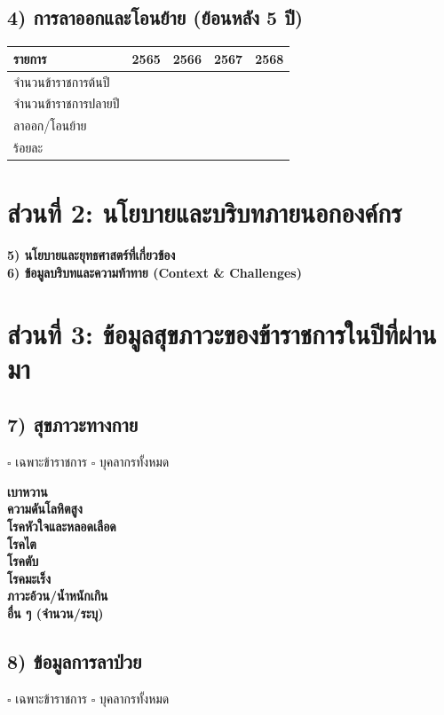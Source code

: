 \documentclass[12pt,a4paper]{article}
\newcommand{\linefield}[1]{\textbf{#1} \hrulefill}
\newcommand{\boxitem}[1]{\(\square\) #1}
\begin{document}
\subsection*{4) การลาออกและโอนย้าย (ย้อนหลัง 5 ปี)}
\begin{longtable}{|p{}|p{}|p{}|p{}|p{}|}
\hline
\textbf{รายการ} & \textbf{2565} & \textbf{2566} & \textbf{2567} & \textbf{2568} \\\hline
จำนวนข้าราชการต้นปี & & & & \\\hline
จำนวนข้าราชการปลายปี & & & & \\\hline
ลาออก/โอนย้าย & & & & \\\hline
ร้อยละ & & & & \\\hline
\end{longtable}

\section*{ส่วนที่ 2: นโยบายและบริบทภายนอกองค์กร}
\linefield{5) นโยบายและยุทธศาสตร์ที่เกี่ยวข้อง}\\[2.2em]
\linefield{6) ข้อมูลบริบทและความท้าทาย (Context \& Challenges)}\\[2.2em]

\section*{ส่วนที่ 3: ข้อมูลสุขภาวะของข้าราชการในปีที่ผ่านมา}
\subsection*{7) สุขภาวะทางกาย}
\boxitem{เฉพาะข้าราชการ} \hspace{2em} \boxitem{บุคลากรทั้งหมด}

\linefield{เบาหวาน}\\
\linefield{ความดันโลหิตสูง}\\
\linefield{โรคหัวใจและหลอดเลือด}\\
\linefield{โรคไต}\\
\linefield{โรคตับ}\\
\linefield{โรคมะเร็ง}\\
\linefield{ภาวะอ้วน/น้ำหนักเกิน}\\
\linefield{อื่น ๆ (จำนวน/ระบุ)}

\subsection*{8) ข้อมูลการลาป่วย}
\boxitem{เฉพาะข้าราชการ} \hspace{2em} \boxitem{บุคลากรทั้งหมด}
\end{document}
